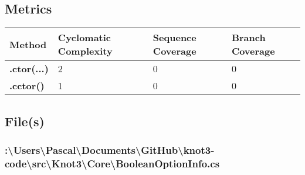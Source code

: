 \documentclass[a4paper,10pt]{article}
\begin{document}
\subsection{Metrics}
\begin{longtable}[l]{|l|l|l|l|}
\hline
\textbf{Method} & \textbf{Cyclomatic Complexity} & \textbf{Sequence Coverage} & \textbf{Branch Coverage}\\
\hline
\textbf{.ctor(...)} & 2 & 0 & 0\\
\hline
\textbf{.cctor()} & 1 & 0 & 0\\
\hline
\end{longtable}
\subsection{File(s)}
\subsubsection{:\textbackslash Users\textbackslash Pascal\textbackslash Documents\textbackslash GitHub\textbackslash knot3-code\textbackslash src\textbackslash Knot3\textbackslash Core\textbackslash BooleanOptionInfo.cs}
\end{document}
